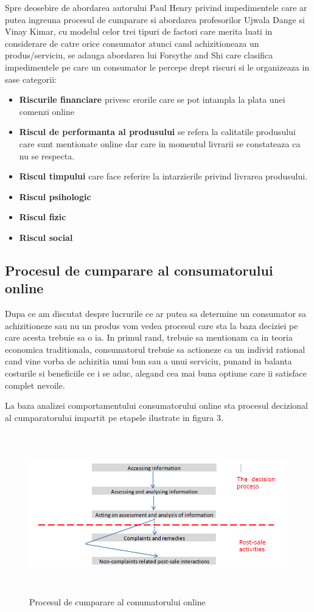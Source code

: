 \documentclass[a4paper, 12pt]{article}
\begin{document}
	\quad Spre deosebire de abordarea autorului Paul Henry privind impedimentele care ar putea ingreuna procesul de cumparare si abordarea profesorilor Ujwala Dange si Vinay Kimar, cu modelul celor trei tipuri de factori care merita luati in considerare de catre orice consumator atunci cand achizitioneaza un produs/serviciu, se adauga abordarea lui Forsythe and Shi care clasifica impedimentele pe care un consumator le percepe drept riscuri si le organizeaza in sase categorii:
	\begin{itemize}
		\item\textbf{Riscurile  financiare} privesc erorile care se pot intampla la plata unei comenzi online
		\item\textbf{Riscul de performanta al produsului} se refera la calitatile produsului care sunt mentionate online dar care in momentul livrarii se constateaza ca nu se respecta.
		\item\textbf{Riscul timpului} care face referire la intarzierile privind livrarea produsului.
		\item\textbf{Riscul psihologic} 
		\item\textbf{Riscul fizic}
		\item\textbf{Riscul social}
		
	\end{itemize}

	\subsection{Procesul de cumparare al consumatorului online}
		\quad\quad Dupa ce am discutat despre lucrurile ce ar putea sa determine un consumator sa achizitioneze sau nu un produs vom vedea procesul care sta la baza deciziei pe care acesta trebuie sa o ia. In primul rand, trebuie sa mentionam ca in teoria economica traditionala, consumatorul trebuie sa actioneze ca un individ rational cand vine vorba de achizitia unui bun sau a unui serviciu, punand in balanta costurile si beneficiile ce i se aduc, alegand cea mai buna optiune care ii satisface complet nevoile.
		
		\quad La baza analizei comportamentului consumatorului online sta procesul decizional al cumparatorului impartit pe etapele ilustrate in figura 3.
		\begin{figure}[!htb]
			\centering
			\includegraphics[width=12cm, height=7cm]{"figures/third.png"}
			\caption{Procesul de cumparare al conumatorului online}\label{fig:third}
		\end{figure}
	
\end{document}
